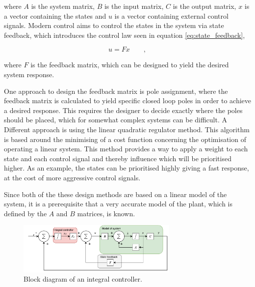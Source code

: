 \documentclass[../../main.tex]{subfiles}
\begin{document}
where $A$ is the system matrix, $B$ is the input matrix, $C$ is the output matrix,  $x$ is a vector containing the states and $u$ is a vector containing external control signals.
Modern control aims to control the states in the system via state feedback, which introduces the control law seen in equation \ref{eq:state_feedback},

\begin{equation}\label{eq:state_feedback}
    u = F x \qquad ,
\end{equation}

where $F$ is the feedback matrix, which can be designed to yield the desired system response.





One approach to design the feedback matrix is pole assignment, where the feedback matrix is calculated to yield specific closed loop poles in order to achieve a desired response. This requires the designer to decide exactly where the poles should be placed, which for somewhat complex systems can be difficult.
A Different approach is using the linear quadratic regulator method. This algorithm is based around the minimising of a cost function concerning the optimisation of operating a linear system. This method provides a way to apply a weight to each state and each control signal and thereby influence which will be prioritised higher. As an example, the states can be prioritised highly giving a fast response, at the cost of more aggressive control signals.

Since both of the these design methods are based on a linear model of the system, it is a prerequisite that a very accurate model of the plant, which is defined by the $A$ and $B$ matrices, is known. 

\begin{figure}
    \centering
    \includegraphics[width=0.7\textwidth]{Sections/Miscellaneous/Images/Statefeedback_Integral.pdf}
    \caption{Block diagram of an integral controller.}
    \label{fig:Integral_Diagram}
\end{figure}
\end{document}
